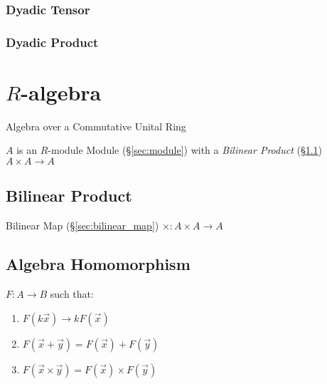 \subsubsection{Dyadic Tensor}\label{sec:dyadic_tensor}

\subsubsection{Dyadic Product}\label{sec:dyadic_product}



\section{$R$-algebra}\label{sec:r_algebra}

Algebra over a Commutative Unital Ring

$A$ is an $R$-module Module (\S\ref{sec:module}) with a \emph{Bilinear Product}
(\S\ref{sec:bilinear_product}) $A \times A \rightarrow A$




\subsection{Bilinear Product}\label{sec:bilinear_product}

Bilinear Map (\S\ref{sec:bilinear_map}) $\times : A \times A \rightarrow A$



\subsection{Algebra Homomorphism}\label{sec:algebra_homomorphism}

$F : A \rightarrow B$ such that:
\begin{enumerate}
  \item $F(k\vec{x}) \rightarrow kF(\vec{x})$
  \item $F(\vec{x} + \vec{y}) = F(\vec{x}) + F(\vec{y})$
  \item $F(\vec{x} \times \vec{y}) = F(\vec{x}) \times F(\vec{y})$
\end{enumerate}

